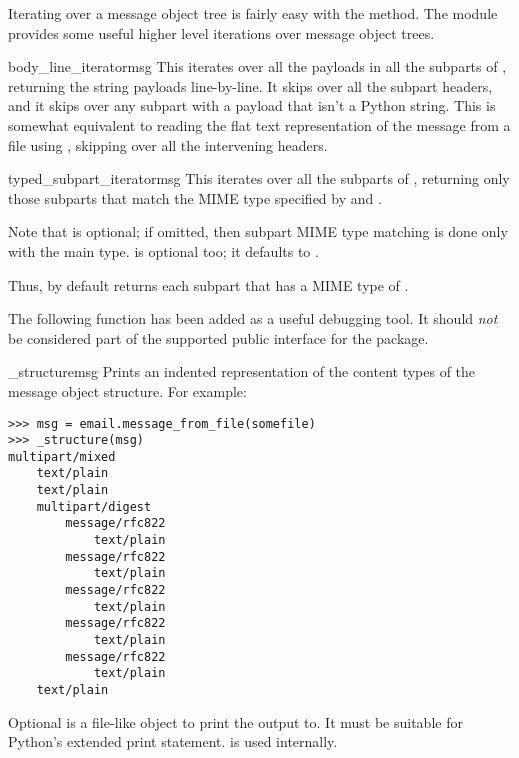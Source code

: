 
Iterating over a message object tree is fairly easy with the
 method.  The  module
provides some useful higher level iterations over message object
trees.

\begin{funcdesc}{body_line_iterator}{msg}
This iterates over all the payloads in all the subparts of ,
returning the string payloads line-by-line.  It skips over all the
subpart headers, and it skips over any subpart with a payload that
isn't a Python string.  This is somewhat equivalent to reading the
flat text representation of the message from a file using
, skipping over all the intervening headers.
\end{funcdesc}

\begin{funcdesc}{typed_subpart_iterator}{msg}
This iterates over all the subparts of , returning only those
subparts that match the MIME type specified by  and
.

Note that  is optional; if omitted, then subpart MIME
type matching is done only with the main type.   is
optional too; it defaults to .

Thus, by default  returns each
subpart that has a MIME type of .
\end{funcdesc}

The following function has been added as a useful debugging tool.  It
should \emph{not} be considered part of the supported public interface
for the package.

\begin{funcdesc}{_structure}{msg}
Prints an indented representation of the content types of the
message object structure.  For example:

\begin{verbatim}
>>> msg = email.message_from_file(somefile)
>>> _structure(msg)
multipart/mixed
    text/plain
    text/plain
    multipart/digest
        message/rfc822
            text/plain
        message/rfc822
            text/plain
        message/rfc822
            text/plain
        message/rfc822
            text/plain
        message/rfc822
            text/plain
    text/plain
\end{verbatim}

Optional  is a file-like object to print the output to.  It
must be suitable for Python's extended print statement.  
is used internally.
\end{funcdesc}

